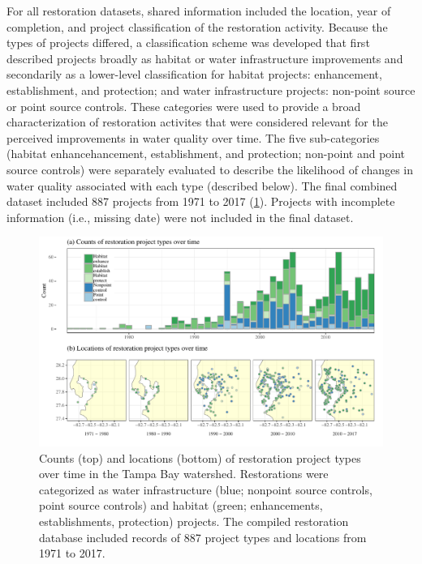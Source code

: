 \documentclass[]{article}
\begin{document}
For all restoration datasets, shared information included the location,
year of completion, and project classification of the restoration
activity. Because the types of projects differed, a classification
scheme was developed that first described projects broadly as habitat or
water infrastructure improvements and secondarily as a lower-level
classification for habitat projects: enhancement, establishment, and
protection; and water infrastructure projects: non-point source or point
source controls. These categories were used to provide a broad
characterization of restoration activites that were considered relevant
for the perceived improvements in water quality over time. The five
sub-categories (habitat enhancehancement, establishment, and protection;
non-point and point source controls) were separately evaluated to
describe the likelihood of changes in water quality associated with each
type (described below). The final combined dataset included 887 projects
from 1971 to 2017 (\cref{fig:restyrs}). Projects with incomplete
information (i.e., missing date) were not included in the final dataset.

\begin{figure}
\centerline{\includegraphics[width = \textwidth]{figs/restyrs.pdf}}
\caption{Counts (top) and locations (bottom) of restoration project types over time in the Tampa Bay watershed.  Restorations were categorized as water infrastructure (blue; nonpoint source controls, point source controls) and habitat (green; enhancements, establishments, protection) projects.  The compiled restoration database included records of 887 project types and locations from 1971 to 2017.}
\label{fig:restyrs}
\end{figure}
\end{document}
